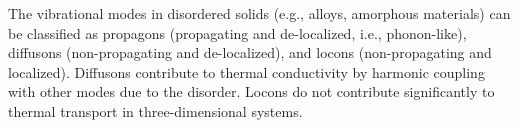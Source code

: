 \documentclass[aps,prb,onecolumn,preprint,superscriptaddress,footinbib,amsmath,amssymb,floatfix]{revtex4}
\begin{document}

The vibrational modes in disordered solids (e.g., alloys, 
amorphous materials) can be 
classified as propagons (propagating and de-localized, 
i.e., phonon-like), diffusons (non-propagating and 
de-localized), and locons (non-propagating and localized).
\cite{allen_thermal_1993,allen_diffusons_1999} 
Diffusons contribute to thermal conductivity by harmonic coupling 
with other modes due to the disorder. Locons do not contribute 
significantly to thermal transport in three-dimensional systems.
\cite{leitner_vibrational_2001}
\end{document}
